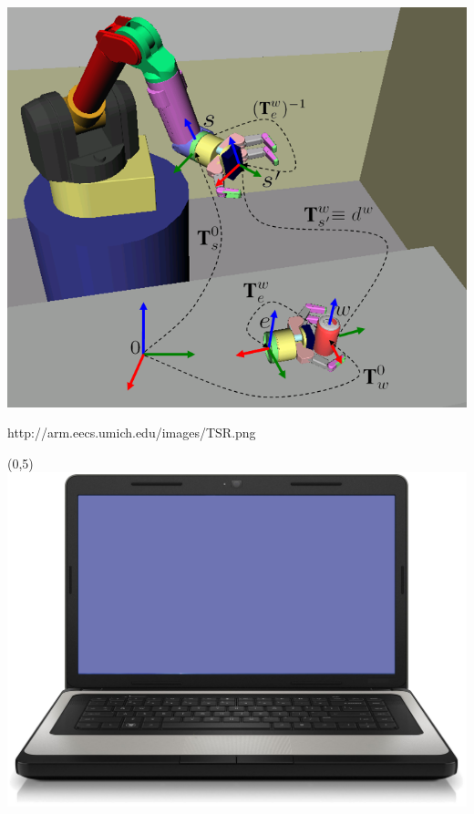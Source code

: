 \documentclass{beamer}
\begin{document}
\begin{frame}[plain]{}
\begin{textblock}{5}
                    \includegraphics[width=1.2\linewidth]{figures/pick_and_place.png}
                    
                    \tiny{http://arm.eecs.umich.edu/images/TSR.png}
                \end{textblock}                
          \begin{textblock}{5}(0,5)
              \includegraphics[width=0.6\linewidth]{figures/laptop.png}
          
            \end{textblock} 
            \end{frame}
        
\end{document}

